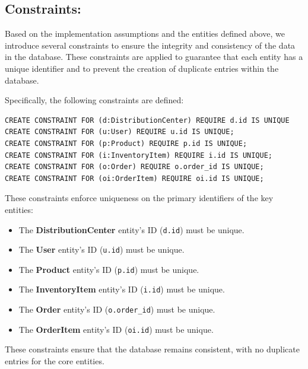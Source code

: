 \documentclass[a4paper,12pt]{article}
\begin{document}
\subsection{Constraints:}
\par Based on the implementation assumptions and the entities defined above, we introduce several constraints to ensure the integrity and consistency of the data in the database. These constraints are applied to guarantee that each entity has a unique identifier and to prevent the creation of duplicate entries within the database.

\par Specifically, the following constraints are defined:

\begin{verbatim}
CREATE CONSTRAINT FOR (d:DistributionCenter) REQUIRE d.id IS UNIQUE 
CREATE CONSTRAINT FOR (u:User) REQUIRE u.id IS UNIQUE;
CREATE CONSTRAINT FOR (p:Product) REQUIRE p.id IS UNIQUE;
CREATE CONSTRAINT FOR (i:InventoryItem) REQUIRE i.id IS UNIQUE;
CREATE CONSTRAINT FOR (o:Order) REQUIRE o.order_id IS UNIQUE;
CREATE CONSTRAINT FOR (oi:OrderItem) REQUIRE oi.id IS UNIQUE;
\end{verbatim}

\par These constraints enforce uniqueness on the primary identifiers of the key entities:
\begin{itemize}[noitemsep]
    \item The \textbf{DistributionCenter} entity's ID (\texttt{d.id}) must be unique.
    \item The \textbf{User} entity's ID (\texttt{u.id}) must be unique.
    \item The \textbf{Product} entity's ID (\texttt{p.id}) must be unique.
    \item The \textbf{InventoryItem} entity's ID (\texttt{i.id}) must be unique.
    \item The \textbf{Order} entity's ID (\texttt{o.order\_id}) must be unique.
    \item The \textbf{OrderItem} entity's ID (\texttt{oi.id}) must be unique.
\end{itemize}

\par These constraints ensure that the database remains consistent, with no duplicate entries for the core entities.
\end{document}
